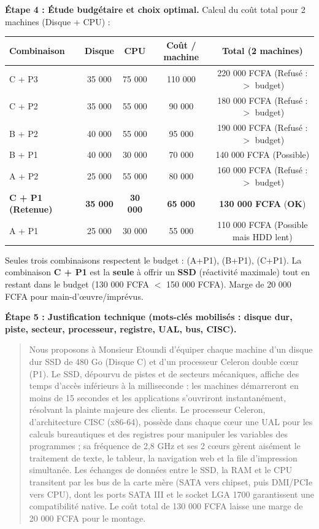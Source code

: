 \documentclass[11pt]{article}
\newcommand{\cle}[1]{{\popxbold\color{popdark}#1}}
\begin{document}
\begin{exoresolu}
\textbf{Étape 4 : Étude budgétaire et choix optimal.}
Calcul du coût total pour 2 machines (Disque + CPU) :
\begin{center}
\begin{tabular}{|l|c|c|c|c|}
\hline
\rowcolor{popblueL} \textbf{Combinaison} & \textbf{Disque} & \textbf{CPU} & \textbf{Coût / machine} & \textbf{Total (2 machines)} \\
\hline
C + P3 & 35 000 & 75 000 & 110 000 & 220 000 FCFA (Refusé : $>$ budget) \\
\hline
C + P2 & 35 000 & 55 000 & 90 000 & 180 000 FCFA (Refusé : $>$ budget) \\
\hline
B + P2 & 40 000 & 55 000 & 95 000 & 190 000 FCFA (Refusé : $>$ budget) \\
\hline
B + P1 & 40 000 & 30 000 & 70 000 & 140 000 FCFA (Possible) \\
\hline
A + P2 & 25 000 & 55 000 & 80 000 & 160 000 FCFA (Refusé : $>$ budget) \\
\hline
\textbf{C + P1 (Retenue)} & \textbf{35 000} & \textbf{30 000} & \textbf{65 000} & \textbf{130 000 FCFA} (\textbf{OK}) \\
\hline
A + P1 & 25 000 & 30 000 & 55 000 & 110 000 FCFA (Possible mais HDD lent) \\
\hline
\end{tabular}
\end{center}
Seules trois combinaisons respectent le budget : (A+P1), (B+P1), (C+P1).
La combinaison \textbf{C + P1} est la \textbf{seule} à offrir un \textbf{SSD} (réactivité maximale) tout en restant dans le budget (130 000 FCFA $<$ 150 000 FCFA). Marge de 20 000 FCFA pour main-d'œuvre/imprévus.

\textbf{Étape 5 : Justification technique (mots-clés mobilisés : disque dur, piste, secteur, processeur, registre, UAL, bus, CISC).}
\begin{quote}
Nous proposons à Monsieur Etoundi d'équiper chaque machine d'un \cle{disque dur} SSD de 480 Go (Disque C) et d'un \cle{processeur} Celeron double cœur (P1). Le SSD, dépourvu de \cle{pistes} et de \cle{secteurs} mécaniques, affiche des temps d'accès inférieurs à la milliseconde : les machines démarreront en moins de 15 secondes et les applications s'ouvriront instantanément, résolvant la plainte majeure des clients. Le \cle{processeur} Celeron, d'architecture \cle{CISC} (x86-64), possède dans chaque cœur une \cle{UAL} pour les calculs bureautiques et des \cle{registres} pour manipuler les variables des programmes ; sa fréquence de 2,8 GHz et ses 2 cœurs gèrent aisément le traitement de texte, le tableur, la navigation web et la file d'impression simultanée. Les échanges de données entre le SSD, la RAM et le CPU transitent par les \cle{bus} de la carte mère (SATA vers chipset, puis DMI/PCIe vers CPU), dont les ports SATA III et le socket LGA 1700 garantissent une compatibilité native. Le coût total de 130 000 FCFA laisse une marge de 20 000 FCFA pour le montage.
\end{quote}


\end{exoresolu}
\end{document}
